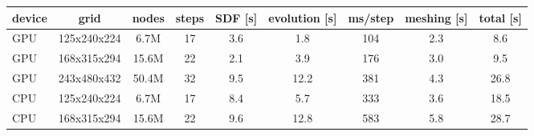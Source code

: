 \begin{tabular}{lcccccccc}
\toprule
device & grid & nodes & steps & SDF [s] & evolution [s] & ms/step & meshing [s] & total [s] \\
\midrule
GPU & 125x240x224 & 6.7M & 17 & 3.6 & 1.8 & 104 & 2.3 & 8.6 \\
GPU & 168x315x294 & 15.6M & 22 & 2.1 & 3.9 & 176 & 3.0 & 9.5 \\
GPU & 243x480x432 & 50.4M & 32 & 9.5 & 12.2 & 381 & 4.3 & 26.8 \\
CPU & 125x240x224 & 6.7M & 17 & 8.4 & 5.7 & 333 & 3.6 & 18.5 \\
CPU & 168x315x294 & 15.6M & 22 & 9.6 & 12.8 & 583 & 5.8 & 28.7 \\
\bottomrule
\end{tabular}
